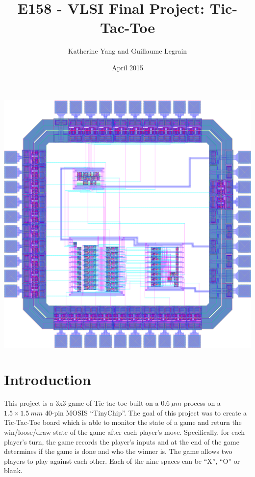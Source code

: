 \documentclass[]{article}
\title{E158 - VLSI Final Project: Tic-Tac-Toe}
\author{Katherine Yang and Guillaume Legrain}
\date{April 2015}
\begin{document}
\maketitle
{\centering
\includegraphics[scale=0.15]{chip-layout} \par
}

\clearpage

\section{Introduction}
\label{sec:introduction}
This project is a 3x3 game of Tic-tac-toe built on a $0.6~\mu m$ process on a $1.5 \times 1.5~mm$ 40-pin MOSIS ``TinyChip''. The goal of this project was to create a Tic-Tac-Toe board which is able to monitor the state of a game and return the win/loose/draw state of the game after each player's move. Specifically, for each player's turn, the game records the player's inputs and at the end of the game determines if the game is done and who the winner is. The game allows two players to play against each other. Each of the nine spaces can be ``X'', ``O'' or blank. 
\end{document}
